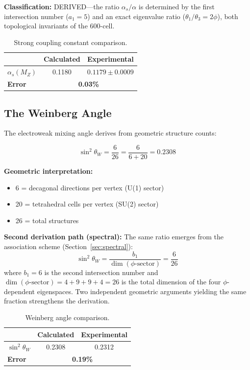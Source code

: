 \documentclass[12pt,a4paper]{article}
\begin{document}
\textbf{Classification:} DERIVED---the ratio $\alpha_s/\alpha$ is determined by the first intersection number ($a_1 = 5$) and an exact eigenvalue ratio ($\theta_1/\theta_3 = 2\phi$), both topological invariants of the 600-cell.

\begin{table}[H]
\centering
\begin{tabular}{lcc}
\toprule
& \textbf{Calculated} & \textbf{Experimental} \\
\midrule
$\alpha_s(M_Z)$ & 0.1180 & $0.1179 \pm 0.0009$ \\
\textbf{Error} & \multicolumn{2}{c}{\textbf{0.03\%}} \\
\bottomrule
\end{tabular}
\caption{Strong coupling constant comparison.}
\end{table}

\subsection{The Weinberg Angle}

The electroweak mixing angle derives from geometric structure counts:

\begin{equation}
\sin^2\theta_W = \frac{6}{26} = \frac{6}{6+20} = 0.2308
\end{equation}

\textbf{Geometric interpretation:}
\begin{itemize}
    \item 6 = decagonal directions per vertex (U(1) sector)
    \item 20 = tetrahedral cells per vertex (SU(2) sector)
    \item 26 = total structures
\end{itemize}

\textbf{Second derivation path (spectral):} The same ratio emerges from the association scheme (Section~\ref{sec:spectral}):
\begin{equation}
\sin^2\theta_W = \frac{b_1}{\dim(\phi\text{-sector})} = \frac{6}{26}
\end{equation}
where $b_1 = 6$ is the second intersection number and $\dim(\phi\text{-sector}) = 4 + 9 + 9 + 4 = 26$ is the total dimension of the four $\phi$-dependent eigenspaces. Two independent geometric arguments yielding the same fraction strengthens the derivation.

\begin{table}[H]
\centering
\begin{tabular}{lcc}
\toprule
& \textbf{Calculated} & \textbf{Experimental} \\
\midrule
$\sin^2\theta_W$ & 0.2308 & 0.2312 \\
\textbf{Error} & \multicolumn{2}{c}{\textbf{0.19\%}} \\
\bottomrule
\end{tabular}
\caption{Weinberg angle comparison.}
\end{table}
\end{document}
